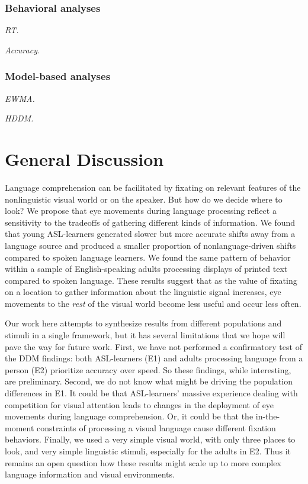 \documentclass[10pt, letterpaper]{article}
\begin{document}
\subsubsection{Behavioral analyses}\label{behavioral-analyses-1}

\emph{RT.}

\emph{Accuracy.}

\subsubsection{Model-based analyses}\label{model-based-analyses-1}

\emph{EWMA.}

\emph{HDDM.}

\section{General Discussion}\label{general-discussion}

Language comprehension can be facilitated by fixating on relevant
features of the nonlinguistic visual world or on the speaker. But how do
we decide where to look? We propose that eye movements during language
processing reflect a sensitivity to the tradeoffs of gathering different
kinds of information. We found that young ASL-learners generated slower
but more accurate shifts away from a language source and produced a
smaller proportion of nonlanguage-driven shifts compared to spoken
language learners. We found the same pattern of behavior within a sample
of English-speaking adults processing displays of printed text compared
to spoken language. These results suggest that as the value of fixating
on a location to gather information about the linguistic signal
increases, eye movements to the \emph{rest} of the visual world become
less useful and occur less often.

Our work here attempts to synthesize results from different populations
and stimuli in a single framework, but it has several limitations that
we hope will pave the way for future work. First, we have not performed
a confirmatory test of the DDM findings: both ASL-learners (E1) and
adults processing language from a person (E2) prioritize accuracy over
speed. So these findings, while interesting, are preliminary. Second, we
do not know what might be driving the population differences in E1. It
could be that ASL-learners' massive experience dealing with competition
for visual attention leads to changes in the deployment of eye movements
during language comprehension. Or, it could be that the in-the-moment
constraints of processing a visual language cause different fixation
behaviors. Finally, we used a very simple visual world, with only three
places to look, and very simple linguistic stimuli, especially for the
adults in E2. Thus it remains an open question how these results might
scale up to more complex language information and visual environments.
\end{document}
